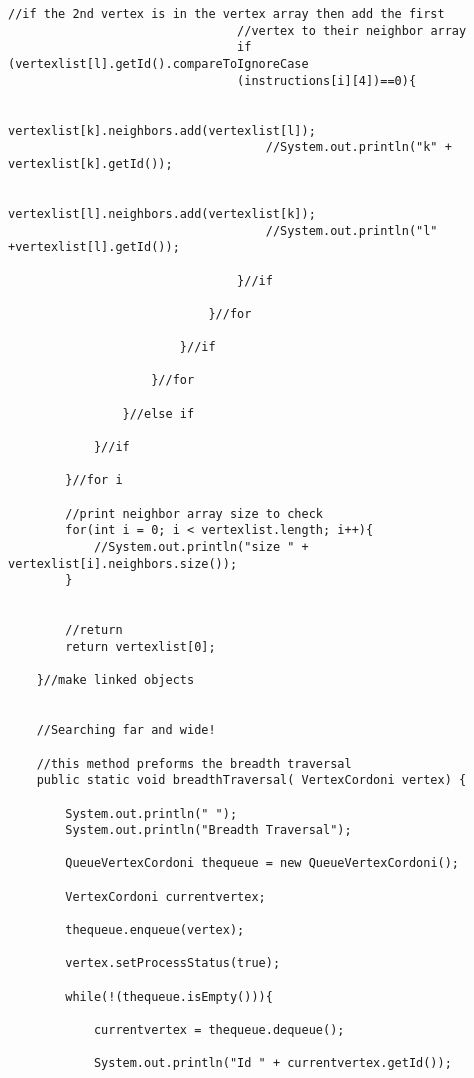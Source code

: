 \documentclass[letterpaper, 10pt,DIV=13]{scrartcl}
\numberwithin{equation}{section} %
\numberwithin{figure}{section} %
\numberwithin{table}{section} %
\begin{document}
\begin{lstlisting}[frame=single, ]
                                //if the 2nd vertex is in the vertex array then add the first
                                //vertex to their neighbor array
                                if (vertexlist[l].getId().compareToIgnoreCase
                                (instructions[i][4])==0){

                                    vertexlist[k].neighbors.add(vertexlist[l]);
                                    //System.out.println("k" + vertexlist[k].getId());

                                    vertexlist[l].neighbors.add(vertexlist[k]);
                                    //System.out.println("l" +vertexlist[l].getId());

                                }//if
                                
                            }//for

                        }//if
        
                    }//for
    
                }//else if

            }//if
            
        }//for i

        //print neighbor array size to check
        for(int i = 0; i < vertexlist.length; i++){
            //System.out.println("size " + vertexlist[i].neighbors.size());
        }


        //return
        return vertexlist[0];

    }//make linked objects 


    //Searching far and wide!

    //this method preforms the breadth traversal 
    public static void breadthTraversal( VertexCordoni vertex) {

        System.out.println(" ");
        System.out.println("Breadth Traversal");

        QueueVertexCordoni thequeue = new QueueVertexCordoni();

        VertexCordoni currentvertex;
        
        thequeue.enqueue(vertex);

        vertex.setProcessStatus(true);

        while(!(thequeue.isEmpty())){

            currentvertex = thequeue.dequeue();

            System.out.println("Id " + currentvertex.getId());
            

\end{lstlisting}
\end{document}
